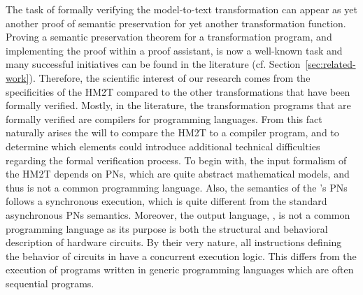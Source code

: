 \documentclass[pdflatex,sn-mathphys]{sn-jnl}%
\theoremstyle{thmstyleone}%
\theoremstyle{thmstyletwo}%
\theoremstyle{thmstylethree}%
\begin{document}
The task of formally verifying the \hilecop{} model-to-text
transformation can appear as yet another proof of semantic
preservation for yet another transformation function. Proving a
semantic preservation theorem for a transformation program, and
implementing the proof within a proof assistant, is now a well-known
task and many successful initiatives can be found in the literature
(cf. Section~\ref{sec:related-work}).  Therefore, the scientific
interest of our research comes from the specificities of the HM2T
compared to the other transformations that have been formally
verified. Mostly, in the literature, the transformation programs that
are formally verified are compilers for programming languages. From
this fact naturally arises the will to compare the HM2T to a compiler
program, and to determine which elements could introduce additional
technical difficulties regarding the formal verification process.  To
begin with, the input formalism of the HM2T depends on PNs, which are
quite abstract mathematical models, and thus is not a common
programming language. Also, the semantics of the \hilecop{}'s PNs
follows a synchronous execution, which is quite different from the
standard asynchronous PNs semantics. Moreover, the output language,
\vhdl{}, is not a common programming language as its purpose is both
the structural and behavioral description of hardware circuits. By
their very nature, all instructions defining the behavior of circuits
in \vhdl{} have a concurrent execution logic. This differs from the
execution of programs written in generic programming languages which
are often sequential programs.


\end{document}
